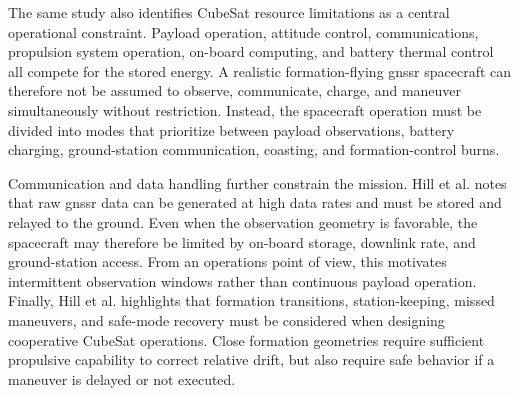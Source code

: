 The same study also identifies CubeSat resource limitations as a central operational constraint. Payload operation, attitude control, communications, propulsion system operation, on-board computing, and battery thermal control all compete for the stored energy. A realistic formation-flying \gls{gnssr} spacecraft can therefore not be assumed to observe, communicate, charge, and maneuver simultaneously without restriction. Instead, the spacecraft operation must be divided into modes that prioritize between payload observations, battery charging, ground-station communication, coasting, and formation-control burns.

Communication and data handling further constrain the mission. Hill et al. notes that raw \gls{gnssr} data can be generated at high data rates and must be stored and relayed to the ground. Even when the observation geometry is favorable, the spacecraft may therefore be limited by on-board storage, downlink rate, and ground-station access. From an operations point of view, this motivates intermittent observation windows rather than continuous payload operation. Finally, Hill et al. highlights that formation transitions, station-keeping, missed maneuvers, and safe-mode recovery must be considered when designing cooperative CubeSat operations. Close formation geometries require sufficient propulsive capability to correct relative drift, but also require safe behavior if a maneuver is delayed or not executed.

